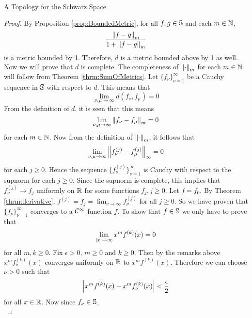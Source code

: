 \begin{section}{A Topology for the Schwarz Space}
\begin{proof}
	By Proposition \ref{prop:BoundedMetric}, for all $f,g \in \schwarz$ and each $\isnatrl[m]$,
		\begin{displaymath}
			\frac{\norm[m]{f-g}}{1+\norm[m]{f-g}}
		\end{displaymath}
	is a metric bounded by 1. Therefore, $d$ is a metric bounded above by 1 as well.
	Now we will prove that $d$ is complete. The completeness of $\norm[m]{\cdot}$ for each
	$\isnatrl[m]$ will follow from Theorem \ref{thrm:SumOfMetrics}. Let $\{f_\nu\}_{\nu=1}^\infty$
	be a Cauchy sequence in $\schwarz$ with respect to $d$. This means that
		\begin{displaymath}
			\lim_{\nu,\mu \rightarrow \infty} d(f_\nu,f_\mu) = 0
		\end{displaymath}
	From the definition of $d$, it is seen that this means
		\begin{displaymath}
			\lim_{\nu,\mu \rightarrow \infty} \norm[m]{f_\nu - f_\mu} = 0
		\end{displaymath}
	for each $\isnatrl[m]$. Now from the definition of $\norm[m]{\cdot}$, it follows that
		\begin{displaymath}
			\lim_{\nu,\mu \rightarrow \infty} \supnorm{f_\nu^{(j)} - f_\mu^{(j)}} = 0
		\end{displaymath}
	for each $j \geq 0$. Hence the sequence $\{f_\nu^{(j)}\}_{\nu=1}^\infty$ is Cauchy 
	with respect to the supnorm for each $j \geq 0$. Since the supnorm is complete, this
	implies that $f_\nu^{(j)} \rightarrow f_j$ uniformly on $\real$ for some functions
	$f_j, j \geq 0$. Let $f = f_0$. By Theorem \ref{thrm:derivative}, $f^{(j)} = f_j
	= \lim_{\nu \rightarrow \infty} f_\nu^{(j)}$ for all $j \geq 0$. So we have proven
	that $\{f_\nu\}_{\nu=1}^\infty$ converges to a $\ctsdiff$ function $f$. To show that
	$f \in \schwarz$ we only have to prove that
		\begin{displaymath}
			\lim_{\modulus{x} \rightarrow \infty} x^m f^{(k)}(x) = 0
		\end{displaymath}
	for all $m,k \geq 0$. Fix $\epsilon > 0$, $m \geq 0$ and $k \geq 0$. Then by the remarks above
	$x^m f_\nu^{(k)}(x)$ converges uniformly on $\real$ to $x^m f^{(k)}(x)$. Therefore
	we can choose $\nu > 0$ such that
		\begin{displaymath}
			\modulus{x^m f^{(k)}(x) - x^m f_\nu^{(k)}(x)} < \frac{\epsilon}{2}
		\end{displaymath}
	for all $\isreal$. Now since $f_\nu \in \schwarz$,
		\begin{displaymath}

\end{displaymath}
\end{proof}
\end{section}
